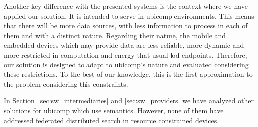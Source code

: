 Another key difference with the presented systems is the context where we have applied our solution.
It is intended to serve in \ac{ubicomp} environments.
This means that there will be more data sources, with less information to process in each of them and with a distinct nature.
Regarding their nature, the mobile and embedded devices which may provide data are less reliable, more dynamic and more restricted in computation and energy that usual \ac{lod} endpoints.
Therefore, our solution is designed to adapt to \ac{ubicomp}'s nature and evaluated considering these restrictions.
To the best of our knowledge, this is the first approximation to the problem considering this constraints.


\bigskip


In Section~\ref{sec:sw_intermediaries} and \ref{sec:sw_providers} we have analyzed other solutions for \ac{ubicomp} which use semantics.
However, none of them have addressed federated distributed search in resource constrained devices.












